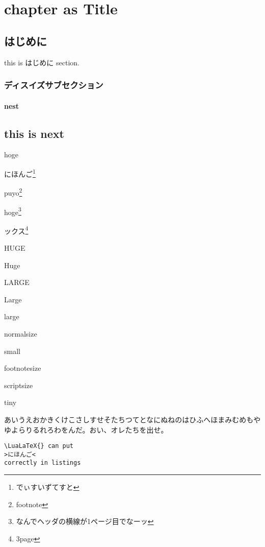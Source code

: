 \documentclass{word-lua}
\author{WORD太郎}
\subtitle{subtitleだぴょんhoge}
\begin{document}
\chapter{chapter as Title}

\section{はじめに}
this is はじめに section.

\subsection{ディスイズサブセクション}

\subsubsection{nest}

\section{this is next}

hoge

にほんご\footnote{でぃすいずてすと}

puyo\footnote{footnote}

hoge\footnote{なんでヘッダの横線が1ページ目でなーッ}

ックス\footnote{3page}

{\HUGE HUGE}

{\Huge Huge}

{\LARGE LARGE}

{\Large Large}

{\large large}

{\normalsize normalsize}

{\small small}

{\footnotesize footnotesize}

{\scriptsize scriptsize}

{\tiny tiny}

あいうえおかきくけこさしすせそたちつてとなにぬねのはひふへほまみむめもやゆよらりるれろわをんだ。おい、オレたちを出せ。

\lstset{language=TeX,numbers=left}
\begin{lstlisting}
\LuaLaTeX{} can put
>にほんご<
correctly in listings
\end{lstlisting}


\end{document}
